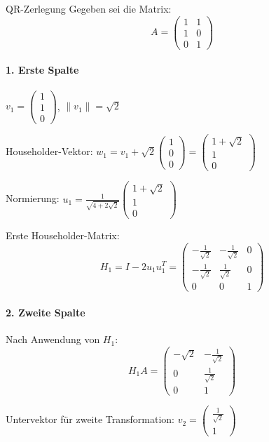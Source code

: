 \begin{example2}{QR-Zerlegung}
Gegeben sei die Matrix:
$$A = \begin{pmatrix}
1 & 1\\
1 & 0\\
0 & 1
\end{pmatrix}$$

\paragraph{1. Erste Spalte}
$v_1 = \begin{pmatrix} 1\\ 1\\ 0 \end{pmatrix}$, 
$\|v_1\| = \sqrt{2}$

Householder-Vektor:
$w_1 = v_1 + \sqrt{2}\begin{pmatrix} 1\\ 0\\ 0 \end{pmatrix} = 
\begin{pmatrix} 1+\sqrt{2}\\ 1\\ 0 \end{pmatrix}$

Normierung:
$u_1 = \frac{1}{\sqrt{4+2\sqrt{2}}}
\begin{pmatrix} 1+\sqrt{2}\\ 1\\ 0 \end{pmatrix}$

Erste Householder-Matrix:
$$H_1 = I - 2u_1u_1^T = 
\begin{pmatrix}
-\frac{1}{\sqrt{2}} & -\frac{1}{\sqrt{2}} & 0\\
-\frac{1}{\sqrt{2}} & \frac{1}{\sqrt{2}} & 0\\
0 & 0 & 1
\end{pmatrix}$$

\paragraph{2. Zweite Spalte}
Nach Anwendung von $H_1$:
$$H_1A = \begin{pmatrix}
-\sqrt{2} & -\frac{1}{\sqrt{2}}\\
0 & \frac{1}{\sqrt{2}}\\
0 & 1
\end{pmatrix}$$

Untervektor für zweite Transformation:
$v_2 = \begin{pmatrix} \frac{1}{\sqrt{2}}\\ 1 \end{pmatrix}$


\end{example2}
